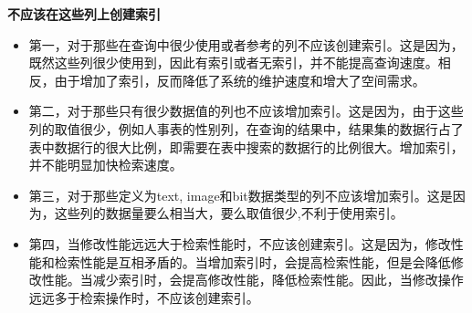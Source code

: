 \textbf{不应该在这些列上创建索引}

\begin{itemize}
    \item 
第一，对于那些在查询中很少使用或者参考的列不应该创建索引。这是因为，既然这些列很少使用到，因此有索引或者无索引，并不能提高查询速度。相反，由于增加了索引，反而降低了系统的维护速度和增大了空间需求。
    \item 
第二，对于那些只有很少数据值的列也不应该增加索引。这是因为，由于这些列的取值很少，例如人事表的性别列，在查询的结果中，结果集的数据行占了表中数据行的很大比例，即需要在表中搜索的数据行的比例很大。增加索引，并不能明显加快检索速度。
    \item 
第三，对于那些定义为text, image和bit数据类型的列不应该增加索引。这是因为，这些列的数据量要么相当大，要么取值很少,不利于使用索引。
    \item 
第四，当修改性能远远大于检索性能时，不应该创建索引。这是因为，修改性能和检索性能是互相矛盾的。当增加索引时，会提高检索性能，但是会降低修改性能。当减少索引时，会提高修改性能，降低检索性能。因此，当修改操作远远多于检索操作时，不应该创建索引。
\end{itemize}

\clearpage













